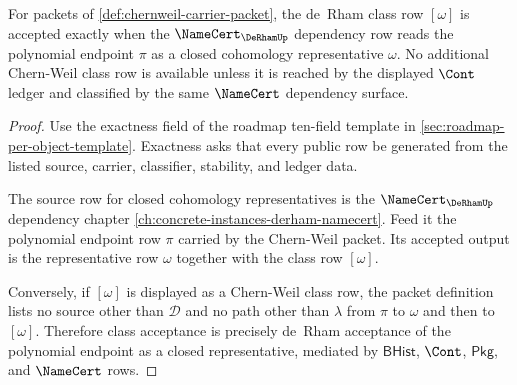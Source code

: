 \begin{theorem}
\label{thm:chernweil-derham-class-exactness-obligation}
For packets of \autoref{def:chernweil-carrier-packet}, the de~Rham class row $[\omega]$ is accepted exactly when the $\NameCert_{\DeRhamUp}$ dependency row reads the polynomial endpoint $\pi$ as a closed cohomology representative $\omega$. No additional Chern-Weil class row is available unless it is reached by the displayed $\Cont$ ledger and classified by the same $\NameCert$ dependency surface.
\end{theorem}
\begin{proof}
Use the exactness field of the roadmap ten-field template in \autoref{sec:roadmap-per-object-template}. Exactness asks that every public row be generated from the listed source, carrier, classifier, stability, and ledger data.

The source row for closed cohomology representatives is the $\NameCert_{\DeRhamUp}$ dependency chapter \autoref{ch:concrete-instances-derham-namecert}. Feed it the polynomial endpoint row $\pi$ carried by the Chern-Weil packet. Its accepted output is the representative row $\omega$ together with the class row $[\omega]$.

Conversely, if $[\omega]$ is displayed as a Chern-Weil class row, the packet definition lists no source other than $\mathcal{D}$ and no path other than $\lambda$ from $\pi$ to $\omega$ and then to $[\omega]$. Therefore class acceptance is precisely de~Rham acceptance of the polynomial endpoint as a closed representative, mediated by $\mathsf{BHist}$, $\Cont$, $\mathsf{Pkg}$, and $\NameCert$ rows.
\end{proof}

